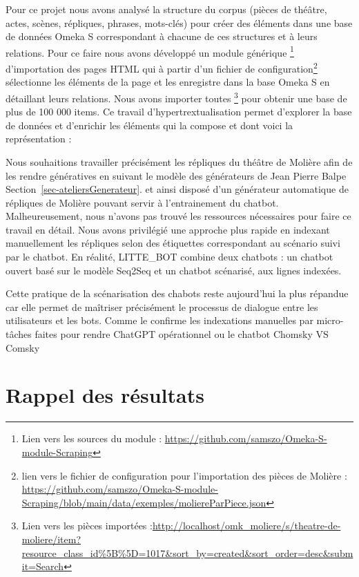 \documentclass[
  letterpaper,
  DIV=11,
  numbers=noendperiod]{scrreprt}
\begin{document}
Pour ce projet nous avons analysé la structure du corpus (pièces de
théâtre, actes, scènes, répliques, phrases, mots-clés) pour créer des
éléments dans une base de données Omeka S correspondant à chacune de ces
structures et à leurs relations. Pour ce faire nous avons développé un
module générique \footnote{Lien vers les sources du module :
  \url{https://github.com/samszo/Omeka-S-module-Scraping}} d'importation
des pages HTML qui à partir d'un fichier de configuration\footnote{lien
  vers le fichier de configuration pour l'importation des pièces de
  Molière :
  \url{https://github.com/samszo/Omeka-S-module-Scraping/blob/main/data/exemples/moliereParPiece.json}}
sélectionne les éléments de la page et les enregistre dans la base Omeka
S en détaillant leurs relations. Nous avons importer toutes \footnote{Lien
  vers les pièces importées
  :\url{http://localhost/omk_moliere/s/theatre-de-moliere/item?resource_class_id\%5B\%5D=1017\&sort_by=created\&sort_order=desc\&submit=Search}}
pour obtenir une base de plus de 100 000 items. Ce travail
d'hypertrextualisation permet d'explorer la base de données et
d'enrichir les éléments qui la compose et dont voici la représentation :

Nous souhaitions travailler précisément les répliques du théâtre de
Molière afin de les rendre génératives en suivant le modèle des
générateurs de Jean Pierre Balpe Section~\ref{sec-ateliersGenerateur}.
et ainsi disposé d'un générateur automatique de répliques de Molière
pouvant servir à l'entrainement du chatbot. Malheureusement, nous
n'avons pas trouvé les ressources nécessaires pour faire ce travail en
détail. Nous avons privilégié une approche plus rapide en indexant
manuellement les répliques selon des étiquettes correspondant au
scénario suivi par le chatbot. En réalité, LITTE\_BOT combine deux
chatbots : un chatbot ouvert basé sur le modèle Seq2Seq et un chatbot
scénarisé, aux lignes indexées.

Cette pratique de la scénarisation des chabots reste aujourd'hui la plus
répandue car elle permet de maîtriser précisément le processus de
dialogue entre les utilisateurs et les bots. Comme le confirme les
indexations manuelles par micro-tâches faites pour rendre ChatGPT
opérationnel ou le chatbot Chomsky VS Comsky

\hypertarget{sec-resultats}{%
\chapter{Rappel des résultats}\label{sec-resultats}}
\end{document}
